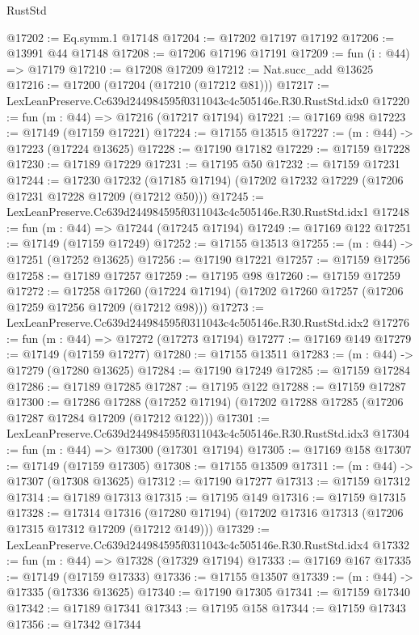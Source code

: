 \begin{lexlean}{RustStd}
\begin{coremodule}
@17202 := Eq.symm.{1} @17148
@17204 := @17202 @17197 @17192
@17206 := @13991 @44 @17148
@17208 := @17206 @17196 @17191
@17209 := fun (i : @44) => @17179
@17210 := @17208 @17209
@17212 := Nat.succ_add @13625
@17216 := @17200 (@17204 (@17210 (@17212 @81)))
@17217 := LexLeanPreserve.Cc639d244984595f0311043c4c505146e.R30.RustStd.idx0
@17220 := fun (m : @44) => @17216 (@17217 @17194)
@17221 := @17169 @98
@17223 := @17149 (@17159 @17221)
@17224 := @17155 @13515
@17227 := (m : @44) -> @17223 (@17224 @13625)
@17228 := @17190 @17182
@17229 := @17159 @17228
@17230 := @17189 @17229
@17231 := @17195 @50
@17232 := @17159 @17231
@17244 := @17230
    @17232
    (@17185 @17194)
    (@17202 @17232 @17229 (@17206 @17231 @17228 @17209 (@17212 @50)))
@17245 := LexLeanPreserve.Cc639d244984595f0311043c4c505146e.R30.RustStd.idx1
@17248 := fun (m : @44) => @17244 (@17245 @17194)
@17249 := @17169 @122
@17251 := @17149 (@17159 @17249)
@17252 := @17155 @13513
@17255 := (m : @44) -> @17251 (@17252 @13625)
@17256 := @17190 @17221
@17257 := @17159 @17256
@17258 := @17189 @17257
@17259 := @17195 @98
@17260 := @17159 @17259
@17272 := @17258
    @17260
    (@17224 @17194)
    (@17202 @17260 @17257 (@17206 @17259 @17256 @17209 (@17212 @98)))
@17273 := LexLeanPreserve.Cc639d244984595f0311043c4c505146e.R30.RustStd.idx2
@17276 := fun (m : @44) => @17272 (@17273 @17194)
@17277 := @17169 @149
@17279 := @17149 (@17159 @17277)
@17280 := @17155 @13511
@17283 := (m : @44) -> @17279 (@17280 @13625)
@17284 := @17190 @17249
@17285 := @17159 @17284
@17286 := @17189 @17285
@17287 := @17195 @122
@17288 := @17159 @17287
@17300 := @17286
    @17288
    (@17252 @17194)
    (@17202 @17288 @17285 (@17206 @17287 @17284 @17209 (@17212 @122)))
@17301 := LexLeanPreserve.Cc639d244984595f0311043c4c505146e.R30.RustStd.idx3
@17304 := fun (m : @44) => @17300 (@17301 @17194)
@17305 := @17169 @158
@17307 := @17149 (@17159 @17305)
@17308 := @17155 @13509
@17311 := (m : @44) -> @17307 (@17308 @13625)
@17312 := @17190 @17277
@17313 := @17159 @17312
@17314 := @17189 @17313
@17315 := @17195 @149
@17316 := @17159 @17315
@17328 := @17314
    @17316
    (@17280 @17194)
    (@17202 @17316 @17313 (@17206 @17315 @17312 @17209 (@17212 @149)))
@17329 := LexLeanPreserve.Cc639d244984595f0311043c4c505146e.R30.RustStd.idx4
@17332 := fun (m : @44) => @17328 (@17329 @17194)
@17333 := @17169 @167
@17335 := @17149 (@17159 @17333)
@17336 := @17155 @13507
@17339 := (m : @44) -> @17335 (@17336 @13625)
@17340 := @17190 @17305
@17341 := @17159 @17340
@17342 := @17189 @17341
@17343 := @17195 @158
@17344 := @17159 @17343
@17356 := @17342
    @17344

\end{coremodule}
\end{lexlean}
